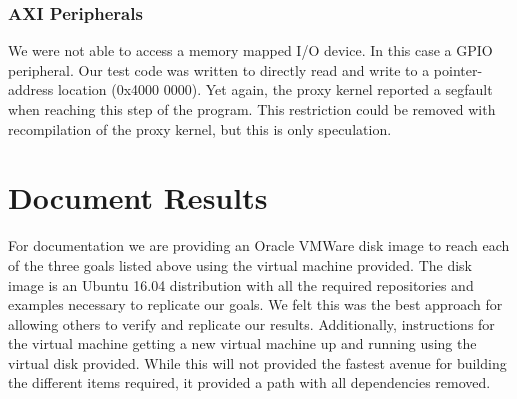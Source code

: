 \documentclass[journal]{IEEEtran}
\begin{document}
\subsubsection{AXI Peripherals}
We were not able to access a memory mapped I/O device. In this case a GPIO peripheral. Our test code was written to directly read and write to a pointer-address location (0x4000 0000). Yet again, the proxy kernel reported a segfault when reaching this step of the program. This restriction could be removed with recompilation of the proxy kernel, but this is only speculation.

\section{Document Results}
For documentation we are providing an Oracle VMWare disk image to reach each of the three goals listed above using the virtual machine provided. The disk image is an Ubuntu 16.04 distribution with all the required repositories and examples necessary to replicate our goals. We felt this was the best approach for allowing others to verify and replicate our results. Additionally, instructions for the virtual machine getting a new virtual machine up and running using the virtual disk provided. While this will not provided the fastest avenue for building the different items required, it provided a path with all dependencies removed. 


%
%

\end{document}
